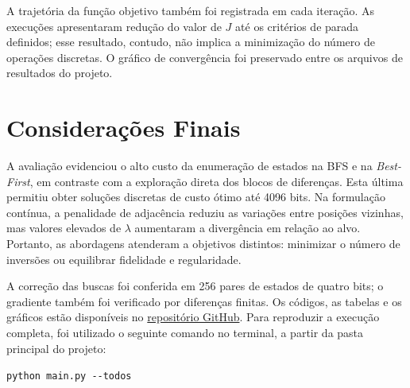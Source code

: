 \documentclass[conference,a4paper]{IEEEtran}
\begin{document}
A trajetória da função objetivo também foi registrada em cada iteração. As execuções apresentaram redução do valor de $J$ até os critérios de parada definidos; esse resultado, contudo, não implica a minimização do número de operações discretas. O gráfico de convergência foi preservado entre os arquivos de resultados do projeto.

\section{Considerações Finais}
A avaliação evidenciou o alto custo da enumeração de estados na BFS e na \textit{Best-First}, em contraste com a exploração direta dos blocos de diferenças. Esta última permitiu obter soluções discretas de custo ótimo até 4096 bits. Na formulação contínua, a penalidade de adjacência reduziu as variações entre posições vizinhas, mas valores elevados de $\lambda$ aumentaram a divergência em relação ao alvo. Portanto, as abordagens atenderam a objetivos distintos: minimizar o número de inversões ou equilibrar fidelidade e regularidade.

A correção das buscas foi conferida em 256 pares de estados de quatro bits; o gradiente também foi verificado por diferenças finitas. Os códigos, as tabelas e os gráficos estão disponíveis no \href{https://github.com/LuanDinizMR/mini-projeto-buscas-otimizacao-IA-0}{repositório GitHub}. Para reproduzir a execução completa, foi utilizado o seguinte comando no terminal, a partir da pasta principal do projeto:
\begin{center}
\verb|python main.py --todos|
\end{center}
\end{document}
